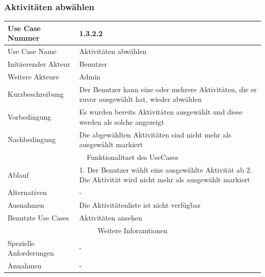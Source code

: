 \documentclass[10pt,a4paper]{article}
\begin{document}
	\subsubsection{Aktivit\"aten abw\"ahlen}
	\begin{tabular}{|l|p{.5\linewidth}|}
	\hline Use Case Nummer & 1.3.2.2 \\ 
	\hline Use Case Name & Aktivit\"aten abw\"ahlen \\ 
	\hline Initiierender Akteur & Benutzer \\
	\hline Weitere Akteure & Admin \\
	\hline Kurzbeschreibung & Der Benutzer kann eine oder mehrere Aktivit\"aten, die er zuvor ausgew\"ahlt hat, wieder abw\"ahlen \\
	\hline Vorbedingung & Es wurden bereits Aktivit\"aten ausgew\"ahlt und diese werden als solche angezeigt \\
	\hline Nachbedingung & Die abgew\"ahlten Aktivit\"aten sind nicht mehr als ausgew\"ahlt markiert \\
	\hline \multicolumn{2}{|c|}{Funktionalitaet des UseCases}\\
	\hline Ablauf & 1. Der Benutzer w\"ahlt eine ausgew\"ahlte Aktivit\"at ab 2. Die Aktivit\"at wird nicht mehr als ausgew\"ahlt markiert \\
	\hline Alternativen & - \\
	\hline Ausnahmen & Die Aktivit\"atenliste ist nicht verf\"ugbar \\
	\hline Benutzte Use Cases & Aktivit\"aten ansehen \\
	\hline \multicolumn{2}{|c|}{Weitere Inforamtionen} \\
	\hline Spezielle Anforderungen & - \\
	\hline Annahmen & - \\
	\hline
	\end{tabular} 
	
\end{document}
